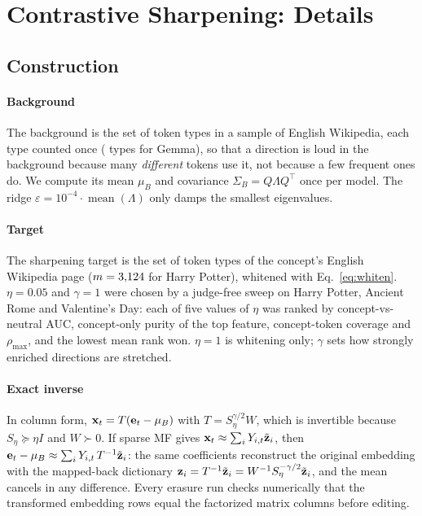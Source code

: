 \section{Contrastive Sharpening: Details}
\label{app:cs}

\subsection{Construction}

\paragraph{Background}
The background is the set of token types in a sample of English Wikipedia, each type counted once ( types for Gemma), so that a direction is loud in the background because many \emph{different} tokens use it, not because a few frequent ones do.
We compute its mean $\mu_B$ and covariance $\Sigma_B = Q\Lambda Q^{\top}$ once per model.
The ridge $\varepsilon = 10^{-4}\cdot\operatorname{mean}(\Lambda)$ only damps the smallest eigenvalues.

\paragraph{Target}
The sharpening target is the set of token types of the concept's English Wikipedia page ($m = 3{,}124$ for Harry Potter), whitened with Eq.~\ref{eq:whiten}.
$\eta = 0.05$ and $\gamma = 1$ were chosen by a judge-free sweep on Harry Potter, Ancient Rome and Valentine's Day: each of five values of $\eta$ was ranked by concept-vs-neutral AUC, concept-only purity of the top feature, concept-token coverage and $\rho_{\max}$, and the lowest mean rank won.
$\eta = 1$ is whitening only; $\gamma$ sets how strongly enriched directions are stretched.

\paragraph{Exact inverse}
In column form, $\mathbf x_t = T(\mathbf{e}_t - \mu_B)$ with $T = S_\eta^{\gamma/2}W$, which is invertible because $S_\eta \succeq \eta I$ and $W \succ 0$.
If sparse MF gives $\mathbf x_t \approx \sum_i Y_{i,t}\tilde{\mathbf{z}}_i$, then $\mathbf{e}_t - \mu_B \approx \sum_i Y_{i,t}\,T^{-1}\tilde{\mathbf{z}}_i$: the same coefficients reconstruct the original embedding with the mapped-back dictionary $\mathbf{z}_i = T^{-1}\tilde{\mathbf{z}}_i = W^{-1}S_\eta^{-\gamma/2}\tilde{\mathbf{z}}_i$, and the mean cancels in any difference.
Every erasure run checks numerically that the transformed embedding rows equal the factorized matrix columns before editing.


